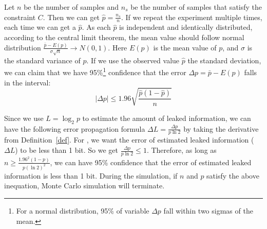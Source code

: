 Let $n$ be the number of samples and $n_s$ be the number of samples that satisfy
the constraint $C$. Then we can get $\hat{p} = \frac{n_s}{n}$. If we repeat the
experiment multiple times, each time we can get a $\hat{p}$. As each
$\hat{p}$ is independent and identically distributed, according to the central limit
theorem, the mean value should follow normal distribution
$ \frac{\bar{p}-E(p)}{\sigma\sqrt{n}} \rightarrow N(0,1) $. Here $E(p)$ is the
mean value of $p$, and $\sigma$ is the standard variance of $p$. If we use the
observed value $\hat{p}$  the standard deviation, we can claim that
we have 95\%\footnote{For a normal distribution, 95\% of variable $\Delta p$ fall within two sigmas of the mean.} 
confidence that the error $\Delta p= \bar{p} - E(p)$ falls in the interval:
$$ |\Delta p| \leq 1.96\sqrt{\frac{ \hat{p} (1- \hat{p} )}{n}}$$

Since we use $L = \log_{2}p$ to estimate the amount of leaked information, we
can have the following error propagation formula $\Delta L = \frac{\Delta
p}{p\ln2}$ by taking the derivative from Definition~\ref{def}. For \tool, we want the error of estimated leaked
information ($\Delta L$) to be less than 1 bit. So we get $\frac{\Delta
p}{p\ln2} \leq 1$. Therefore, as long as $ n \geq \frac{1.96^2(1-p)}{p(\ln2)^2}$, we can have
95\% confidence that the error of estimated leaked information is less than 1 bit.
During the simulation, if $n$ and $p$ satisfy the above inequation, Monte Carlo
simulation will terminate.
